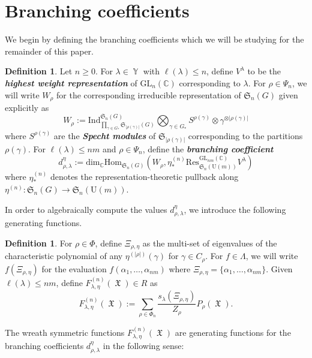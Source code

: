 \documentclass[12pt,reqno]{amsart}
\theoremstyle{definition}
\newtheorem{defn}[thm]{Definition}
\DeclareMathOperator{\Par}{\mathbb{Y}}
\DeclareMathOperator{\fX}{\mathfrak{X}}
\begin{document}
\section{Branching coefficients}

We begin by defining the branching coefficients which we will be studying for the remainder of this paper. 

\begin{defn}
    Let $n \geq 0$.
    For $\lambda \in \Par$ with $\ell(\lambda)\leq n$, define $V^{\lambda}$ to be the \textit{\textbf{highest weight representation}} of $\mathrm{GL}_n(\mathbb{C})$ corresponding to $\lambda.$ For $\rho \in \Psi_n$, we will write $W_{\rho}$ for the corresponding irreducible representation of $\mathfrak{S}_n(G)$ given explicitly as 
    $$W_{\rho}:= \mathrm{Ind}_{\prod_{\gamma \in G_*} \mathfrak{S}_{|\rho(\gamma)|}(G) }^{\mathfrak{S}_n(G)} \bigotimes_{\gamma \in G_*} S^{\rho(\gamma)}\otimes \gamma^{\otimes |\rho(\gamma)|}$$ where $S^{\rho(\gamma)}$ are the \textit{\textbf{Specht modules}} of $\mathfrak{S}_{|\rho(\gamma)|}$ corresponding to the partitions $\rho(\gamma)$.
    For $\ell(\lambda) \leq nm$ and $\rho \in \Psi_n$, define the \textit{\textbf{branching coefficient}} 
    $$d_{\rho,\lambda}^{\eta}:= \mathrm{dim}_{\mathbb{C}} \mathrm{Hom}_{\mathfrak{S}_{n}(G)}\left( W_{\rho}, \eta^{(n)}_*\mathrm{Res}^{\mathrm{GL}_{nm}(\mathbb{C})}_{\mathfrak{S}_n(\mathrm{U}(m))} V^{\lambda} \right)$$ where $\eta^{(n)}_*$ denotes the representation-theoretic pullback along $\eta^{(n)}:\mathfrak{S}_n(G) \rightarrow \mathfrak{S}_n(\mathrm{U}(m)).$
\end{defn} 

In order to algebraically compute the values $d_{\rho,\lambda}^{\eta}$, we introduce the following generating functions.

\begin{defn}
    For $\rho \in \Phi$, define $\Xi_{\rho,\eta}$ as the multi-set of eigenvalues of the characteristic polynomial of any $\eta^{(|\rho|)}(\gamma)$ for $\gamma \in C_{\rho}$. For $f \in \Lambda$, we will write $f(\Xi_{\rho,\eta})$ for the evaluation $f(\alpha_1,\ldots,\alpha_{nm})$ where $\Xi_{\rho,\eta} = \{\alpha_1,\ldots,\alpha_{nm}\}.$ Given $\ell(\lambda) \leq nm$, define $F_{\lambda,\eta}^{(n)}(\fX) \in R$ as 
    $$F_{\lambda,\eta}^{(n)}(\fX):= \sum_{\rho \in \Phi_n} \frac{s_{\lambda}(\Xi_{\rho,\eta})}{Z_{\rho}} P_{\rho}(\fX).$$
\end{defn}

The wreath symmetric functions $F_{\lambda,\eta}^{(n)}(\fX)$ are generating functions for the branching coefficients $d_{\rho,\lambda}^{\eta}$ in the following sense:
\end{document}
